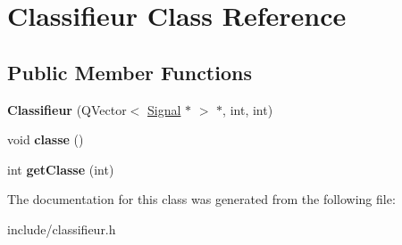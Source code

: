 \hypertarget{class_classifieur}{\section{Classifieur Class Reference}
\label{class_classifieur}
}
\subsection*{Public Member Functions}
\begin{DoxyCompactItemize}
\item 
\hypertarget{class_classifieur_a759077f5caeafc6ff63018c67eb22a36}{{\bfseries Classifieur} (Q\-Vector$<$ \hyperlink{class_signal}{Signal} $\ast$ $>$ $\ast$, int, int)}\label{class_classifieur_a759077f5caeafc6ff63018c67eb22a36}

\item 
\hypertarget{class_classifieur_a498021fda6fd88e1f88faefcd2ee7b92}{void {\bfseries classe} ()}\label{class_classifieur_a498021fda6fd88e1f88faefcd2ee7b92}

\item 
\hypertarget{class_classifieur_ad9b3d4576f26a2091151a1d648c1e214}{int {\bfseries get\-Classe} (int)}\label{class_classifieur_ad9b3d4576f26a2091151a1d648c1e214}

\end{DoxyCompactItemize}


The documentation for this class was generated from the following file\-:\begin{DoxyCompactItemize}
\item 
include/classifieur.\-h\end{DoxyCompactItemize}
